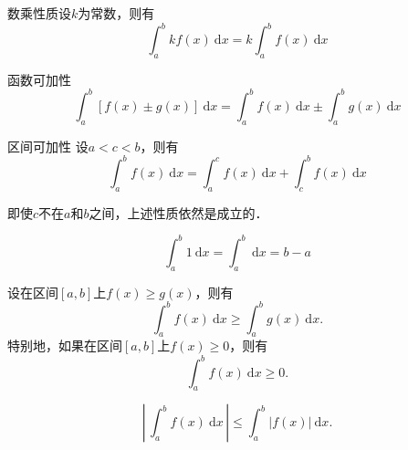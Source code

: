\documentclass[
10pt,
aspectratio=43,
]{beamer}
\begin{document}
\begin{frame}
	\begin{block}{数乘性质}设$k$为常数，则有
		\[
			\int_a^b kf(x)\mathrm{~d} x=k\int_a^b f(x)\mathrm{~d} x
		\]
	\end{block}
	\begin{block}{函数可加性}
		\[
			\int_a^b [f(x) \pm g(x)]\mathrm{~d} x = \int_a^b f(x)\mathrm{~d} x \pm \int_a^b g(x) \mathrm{~d} x
		\]
	\end{block}
	\begin{block}{区间可加性}
		设$a<c<b$，则有
		\[
			\int_a^b f(x)\mathrm{~d} x = \int_a^c f(x)\mathrm{~d} x + \int_c^b f(x)\mathrm{~d} x
		\]
	\end{block}
	即使$c$不在$a$和$b$之间，上述性质依然是成立的．
\end{frame}

\begin{frame}
	\begin{block}{}
		\[
			\int_a^b 1\mathrm{~d} x = \int_a^b \mathrm{~d} x= b-a
		\]
	\end{block}
	\begin{block}{}
		设在区间$[a,b]$上$f(x)\geq g(x)$，则有
		\[
			\int_a^b f(x)\mathrm{~d} x \geq \int_a^b g(x)\mathrm{~d} x.
		\]
		特别地，如果在区间$[a,b]$上$f(x)\geq 0$，则有
		\[
			\int_a^b f(x)\mathrm{~d} x \geq 0.
		\]
	\end{block}
	\begin{block}{}
		$$
			\left|\,\int_a^b f(x)\mathrm{~d} x\,\right| \le \int_a^b\big|f(x)\big|\mathrm{~d} x.
		$$
	\end{block}
\end{frame}
\end{document}
